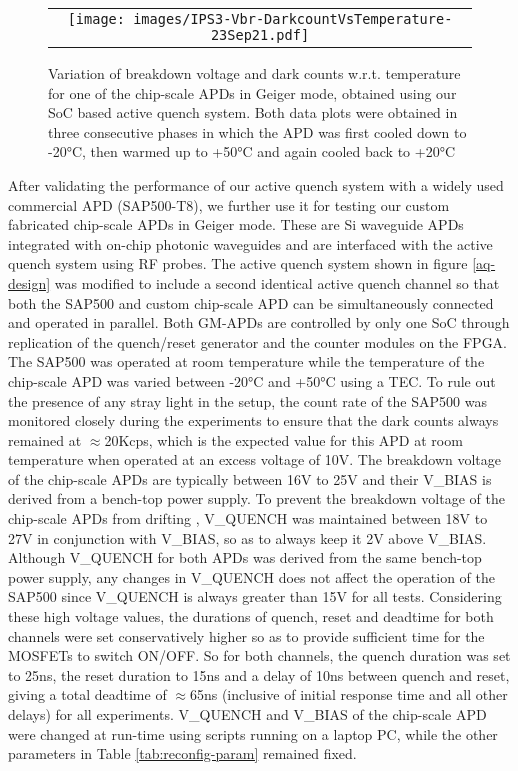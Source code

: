 \begin{figure} [ht]
\begin{center}
\begin{tabular}{c} 
\texttt{[image: images/IPS3-Vbr-DarkcountVsTemperature-23Sep21.pdf]}
\end{tabular}
\end{center}
\caption[] 
{ \label{fig:astar-data} 
Variation of breakdown voltage and dark counts w.r.t. temperature for one of the chip-scale APDs in Geiger mode, obtained using our SoC based active quench system. Both data plots were obtained in three consecutive phases in which the APD was first cooled down to -20°C, then warmed up to +50°C and again cooled back to +20°C}
\end{figure} 
After validating the performance of our active quench system with a widely used commercial APD (SAP500-T8), we further use it for testing our custom fabricated chip-scale APDs\cite{imreAPD21} in Geiger mode. These are Si waveguide APDs integrated with on-chip photonic waveguides and are interfaced with the active quench system using RF probes. The active quench system shown in figure \ref{aq-design} was modified to include a second identical active quench channel so that both the SAP500 and custom chip-scale APD can be simultaneously connected and operated in parallel. Both GM-APDs are controlled by only one SoC through replication of the quench/reset generator and the counter modules on the FPGA. The SAP500 was operated at room temperature while the temperature of the chip-scale APD was varied between -20°C and +50°C using a TEC. To rule out the presence of any stray light in the setup, the count rate of the SAP500 was monitored closely during the experiments to ensure that the dark counts always remained at $\approx$20Kcps, which is the expected value for this APD at room temperature when operated at an excess voltage of 10V. The breakdown voltage of the chip-scale APDs are typically between 16V to 25V and their V\_BIAS is derived from a bench-top power supply. To  prevent the breakdown voltage of the chip-scale APDs from drifting \cite{imreAPD21}, V\_QUENCH was maintained between 18V to 27V in conjunction with V\_BIAS, so as to always keep it 2V above V\_BIAS. Although V\_QUENCH for both APDs was derived from the same bench-top power supply, any changes in V\_QUENCH does not affect the operation of the SAP500 since V\_QUENCH is always greater than 15V for all tests. Considering these high voltage values, the durations of quench, reset and deadtime for both channels were set conservatively higher so as to provide sufficient time for the MOSFETs to switch ON/OFF.
So for both channels, the quench duration was set to 25ns, the reset duration to 15ns and a delay of 10ns between quench and reset, giving a total deadtime of $\approx$65ns (inclusive of initial response time and all other delays) for all experiments. V\_QUENCH and V\_BIAS of the chip-scale APD were changed at run-time using scripts running on a laptop PC, while the other parameters in Table \ref{tab:reconfig-param} remained fixed.

